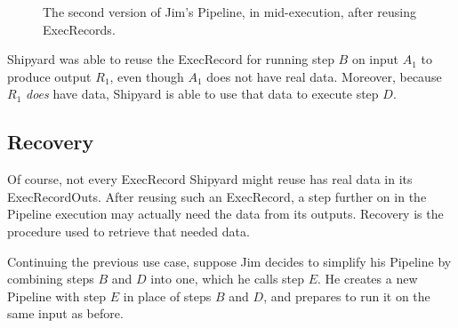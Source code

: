 \documentclass[12pt]{article}
\begin{document}
\begin{figure}[ht]
  \caption{The second version of Jim's Pipeline, in mid-execution, after reusing ExecRecords.}
  \label{fig:newmidexec}
\end{figure}

Shipyard was able to reuse the ExecRecord for running step $B$ on input $A_1$
to produce output $R_1$, even though $A_1$ does not have real data. Moreover,
because $R_1$ \emph{does} have data, Shipyard is able to use that data to
execute step $D$.

\subsection*{Recovery}

Of course, not every ExecRecord Shipyard might reuse has real data in its
ExecRecordOuts. After reusing such an ExecRecord, a step further on in
the Pipeline execution may actually need the data from its outputs. Recovery is
the procedure used to retrieve that needed data.

Continuing the previous use case, suppose Jim decides to simplify his Pipeline
by combining steps $B$ and $D$ into one, which he calls step $E$. He creates a
new Pipeline with step $E$ in place of steps $B$ and $D$, and prepares to run
it on the same input as before.
\end{document}
